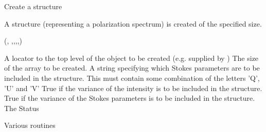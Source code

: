 \begin{manroutinedescription}
     Create a {} {} structure

     A {} {} structure (representing a polarization %
spectrum) is
     created of the specified size.

     {}

     {} {} ({},{}%
,{},{},{},{})

\begin{manparametertable}
 A locator %
to the
                       top level of the object to
                       be created (e.g. supplied by {})
 The size of the %
array to be created.
 A string %
specifying which
                       Stokes parameters are to be included in the
                       structure. This must contain some combination
                       of the letters 'Q', 'U' and 'V'
 True if the %
variance of the intensity
                       is to be included in the structure.
 True if the %
variance of the Stokes
                       parameters is to be included in the structure.
 The Status

\end{manparametertable}
     Various {} routines
\end{manroutinedescription}
